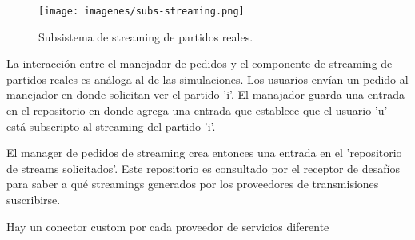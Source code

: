 \begin{figure}[H]
  \centering
  \texttt{[image: imagenes/subs-streaming.png]}
  \caption{Subsistema de streaming de partidos reales.}
\end{figure}

La interacción entre el manejador de pedidos y el componente de streaming de partidos reales es análoga al de las simulaciones.
Los usuarios envían un pedido al manejador en donde solicitan ver el partido 'i'.
El manajador guarda una entrada en el repositorio en donde agrega una entrada que establece que el usuario 'u' está subscripto
al streaming del partido 'i'.

El manager de pedidos de streaming crea entonces una entrada en el 'repositorio de streams solicitados'. Este repositorio es 
consultado por el receptor de desafíos para saber a qué streamings generados por los proveedores de transmisiones suscribirse. 

Hay un conector custom por cada proveedor de servicios diferente
